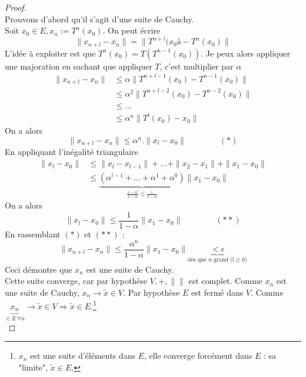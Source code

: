 \begin{proof}\ \\	
	Prouvons d'abord qu'il s'agit d'une suite de Cauchy.\\
	Soit $x_0 \in E, x_n := T^n(x_0)$. On peut écrire
	\begin{equation}
		\| x_{n+l} - x_n\| = \| T^{n+l}(x_0à-T^n(x_0)\|
	\end{equation}
	L'idée à exploiter est que $T^n(x_0) = T(T^{n-1}(x_0))$. Je peux alors appliquer 
	une majoration en sachant que appliquer $T$, c'est multiplier par $\alpha$
	\begin{equation}
		\begin{array}{ll}
			\| x_{n+l} - x_n\| & \leq \alpha \|T^{n+l-1}(x_0) - T^{n-1}(x_0)\|   \\
			                   & \leq \alpha^2 \|T^{n+l-2}(x_0) - T^{n-2}(x_0)\| \\	
			                   & \leq \dots                                      \\
			                   & \leq \alpha^n \|T^{l}(x_0) - x_0\|              
		\end{array}
	\end{equation}
	On a alors
	\begin{equation}
		\| x_{n+l} - x_n\| \leq \alpha^n . \|x_l-x_0\|\qquad\qquad (*)
	\end{equation}
	En appliquant l'inégalité triangulaire 
	\begin{equation}
		\begin{array}{ll}
			\|x_l-x_0\| & \leq \|x_l-x_{l-1}\| + \dots + \|x_2-x_1\| + \|x_1-x_0\|                           \\
			            & \leq \underbrace{(\alpha^{l-1} + \dots + \alpha^1 + \alpha^0)}_{\frac{1-\alpha^l}{ 
			1-\alpha} \leq \frac{1}{1-\alpha}}\|x_1-x_0\|
		\end{array}
	\end{equation}
	On a alors
	\begin{equation}
		\|x_l-x_0\| \leq \frac{1}{1-\alpha}\|x_1-x_0\|\qquad\qquad (**)
	\end{equation}
	En rassemblant $(*)$ et $(**)$ :
	\begin{equation}
		\|x_{n+l}-x_n\| \leq \frac{\alpha^n}{1-\alpha}\|x_1-x_0\| \underbrace{<\epsilon}_{\text{
			dès que $n$ grand ($l\geq0$)}}
	\end{equation}
	Ceci démontre que $x_n$ est une suite de Cauchy.\\
		
	Cette suite converge, car par hypothèse $V,+,\| \|$ est complet. Comme $x_n$ est 
	une suite de Cauchy, $x_n \rightarrow \tilde{x}\in V$. Par hypothèse $E$ est 
	fermé dans $V$. Comme $\underbrace{x_n}_{\in E\ \forall n} \rightarrow \tilde{x}
	\in V \Rightarrow \tilde{x}\in E$.\footnote{$x_n$ est une suite d’éléments dans $E$, 
		elle converge forcément dans $E$ : sa "limite", $\tilde{x}\in E$.}\\
		

\end{proof}
